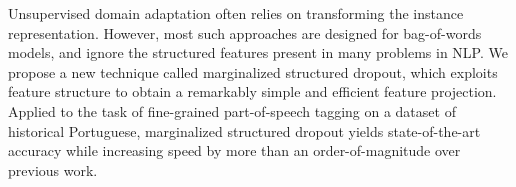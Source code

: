 Unsupervised domain adaptation often relies on transforming the instance representation. However, most such approaches are designed for bag-of-words models, and ignore the structured features present in many problems in NLP. We propose a new technique called marginalized structured dropout, which exploits feature structure to obtain a remarkably simple and efficient feature projection. Applied to the task of fine-grained part-of-speech tagging on a dataset of historical Portuguese, marginalized structured dropout yields state-of-the-art accuracy while increasing speed by more than an order-of-magnitude over previous work.
